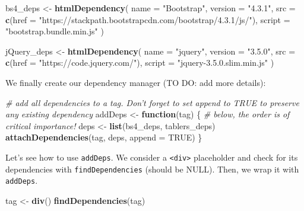 \documentclass[]{book}
\newenvironment{Shaded}{\begin{snugshade}}{\end{snugshade}}
\newcommand{\CommentTok}[1]{\textcolor[rgb]{0.56,0.35,0.01}{\textit{#1}}}
\newcommand{\ControlFlowTok}[1]{\textcolor[rgb]{0.13,0.29,0.53}{\textbf{#1}}}
\newcommand{\DataTypeTok}[1]{\textcolor[rgb]{0.13,0.29,0.53}{#1}}
\newcommand{\KeywordTok}[1]{\textcolor[rgb]{0.13,0.29,0.53}{\textbf{#1}}}
\newcommand{\NormalTok}[1]{#1}
\newcommand{\OtherTok}[1]{\textcolor[rgb]{0.56,0.35,0.01}{#1}}
\newcommand{\StringTok}[1]{\textcolor[rgb]{0.31,0.60,0.02}{#1}}
\begin{document}
\begin{Shaded}
\begin{Highlighting}[]
\NormalTok{bs4_deps <-}\StringTok{ }\KeywordTok{htmlDependency}\NormalTok{(}
  \DataTypeTok{name =} \StringTok{"Bootstrap"}\NormalTok{,}
  \DataTypeTok{version =} \StringTok{"4.3.1"}\NormalTok{,}
  \DataTypeTok{src =} \KeywordTok{c}\NormalTok{(}\DataTypeTok{href =} \StringTok{"https://stackpath.bootstrapcdn.com/bootstrap/4.3.1/js/"}\NormalTok{),}
  \DataTypeTok{script =} \StringTok{"bootstrap.bundle.min.js"}
\NormalTok{)}

\NormalTok{jQuery_deps <-}\StringTok{ }\KeywordTok{htmlDependency}\NormalTok{(}
  \DataTypeTok{name =} \StringTok{"jquery"}\NormalTok{,}
  \DataTypeTok{version =} \StringTok{"3.5.0"}\NormalTok{,}
  \DataTypeTok{src =} \KeywordTok{c}\NormalTok{(}\DataTypeTok{href =} \StringTok{"https://code.jquery.com/"}\NormalTok{),}
  \DataTypeTok{script =} \StringTok{"jquery-3.5.0.slim.min.js"}
\NormalTok{)}
\end{Highlighting}
\end{Shaded}

We finally create our dependency manager (TO DO: add more details):

\begin{Shaded}
\begin{Highlighting}[]
\CommentTok{# add all dependencies to a tag. Don't forget to set append to TRUE to preserve any existing dependency}
\NormalTok{addDeps <-}\StringTok{ }\ControlFlowTok{function}\NormalTok{(tag) \{}
  \CommentTok{# below, the order is of critical importance!}
\NormalTok{  deps <-}\StringTok{ }\KeywordTok{list}\NormalTok{(bs4_deps, tablers_deps)}
  \KeywordTok{attachDependencies}\NormalTok{(tag, deps, }\DataTypeTok{append =} \OtherTok{TRUE}\NormalTok{)}
\NormalTok{\}}
\end{Highlighting}
\end{Shaded}

Let's see how to use \texttt{addDeps}. We consider a \texttt{\textless{}div\textgreater{}} placeholder and check for its dependencies with \texttt{findDependencies} (should be NULL). Then, we wrap it with \texttt{addDeps}.

\begin{Shaded}
\begin{Highlighting}[]
\NormalTok{tag <-}\StringTok{ }\KeywordTok{div}\NormalTok{()}
\KeywordTok{findDependencies}\NormalTok{(tag)}
\end{Highlighting}
\end{Shaded}
\end{document}
